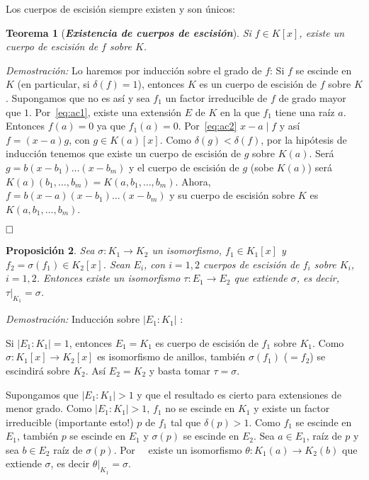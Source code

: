 \documentclass[12pt]{article}
\newtheorem{theorem}{Teorema}[section]
\newtheorem{proposition}[theorem]{Proposición}
\begin{document}
Los cuerpos de escisión siempre existen y son únicos:

\begin{theorem}[\textbf{\textit{Existencia de cuerpos de escisión}}]Si $f \in K[x]$, existe un cuerpo de escisión de $f$ sobre $K$.
\end{theorem}
\emph{Demostración: }Lo haremos por inducción sobre el grado de $f$:
Si $f$ se escinde en $K$ (en particular, si $\delta(f) = 1$), entonces $K$ es un cuerpo de escisión de $f$ sobre $K$. Supongamos que no es así y sea $f_{1}$ un factor irreducible de $f$ de grado mayor que $1$. Por~\ref{eq:ac1}, existe una extensión $E$ de $K$ en la que $f_{1}$ tiene una raíz $a$. Entonces $f(a) = 0$ ya que $f_{1}(a) = 0$. Por~\ref{eq:ac2} $x-a \mid f$ y así $f = (x-a)g$, con $g \in K(a)[x]$. Como $\delta (g) < \delta(f)$, por la hipótesis de inducción tenemos que existe un cuerpo de escisión de $g$ sobre $K(a)$. Será $g = b(x-b_{1}) \ldots (x-b_{m})$ y el cuerpo de escisión de $g$ (sobe $K(a)$) será $K(a)(b_{1}, \ldots, b_{m}) = K(a,b_{1}, \ldots, b_{m})$. Ahora, $f = b(x-a)(x-b_{1}) \ldots (x-b_{m})$ y su cuerpo de escisión sobre $K$ es $K(a, b_{1}, \ldots, b_{m})$.

$\hfill \square$

\begin{proposition}\label{eq:cuesc} Sea $\sigma \colon K_{1} \longrightarrow K_{2}$ un isomorfismo, $f_{1} \in K_{1}[x]$ y $f_{2} = \sigma (f_{1}) \in K_{2}[x]$. Sean $E_{i}$, con $i = 1,2$ cuerpos de escisión de $f_{i}$ sobre $K_{i}$, $i = 1,2$. Entonces existe un isomorfismo $\tau \colon E_{1} \longrightarrow E_{2}$ que extiende $\sigma$, es decir, $ \left.\tau \right|_{K_{1}} = \sigma$.
\end{proposition}
\emph{Demostración: } Inducción sobre $|E_{1}: K_{1}|$ :

Si $|E_{1}:K_{1}| = 1$, entonces $E_{1} = K_{1}$ es cuerpo de escisión de $f_{1}$ sobre $K_{1}$. Como $\sigma \colon K_{1}[x] \longrightarrow K_{2}[x]$ es isomorfismo de anillos, también $\sigma (f_{1})$ ($=f_{2}$) se escindirá sobre $K_{2}$. Así $E_{2} = K_{2}$ y basta tomar $\tau = \sigma$.

Supongamos que $|E_{1}: K_{1}| > 1$ y que el resultado es cierto para extensiones de menor grado. Como $|E_{1}:K_{1}| > 1$, $f_{1}$ no se escinde en $K_{1}$ y existe un factor irreducible (importante esto!) $p$ de $f_{1}$ tal que $\delta (p) > 1$. Como $f_{1}$ se escinde en $E_{1}$, también $p$ se escinde en $E_{1}$ y $\sigma (p)$ se escinde en $E_{2}$. Sea $a \in E_{1}$, raíz de $p$ y sea $b \in E_{2}$ raíz de $\sigma (p)$. Por~~ existe un isomorfismo $\theta	 \colon K_{1}(a) \longrightarrow K_{2}(b)$ que extiende $\sigma$, es decir $\left.\theta \right|_{K_{1}} = \sigma$.
\end{document}
